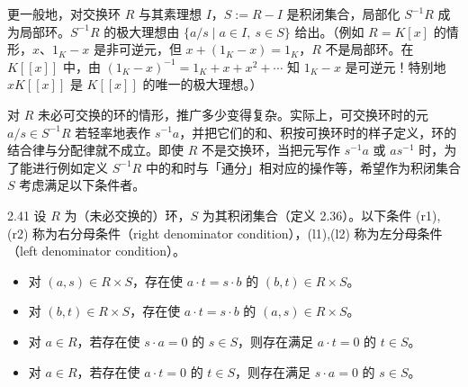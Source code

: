 更一般地，对交换环 $R$ 与其素理想 $I$，$S:=R-I$ 是积闭集合，局部化 $S^{-1}R$ 成为局部环。$S^{-1}R$ 的极大理想由 $\{a/s \mid a\in I,\ s\in S\}$ 给出。（例如 $R=K[x]$ 的情形，$x$、$1_K-x$ 是非可逆元，但 $x+(1_K-x)=1_K$，$R$ 不是局部环。在 $K[[x]]$ 中，由 $(1_K-x)^{-1}=1_K+x+x^2+\cdots$ 知 $1_K-x$ 是可逆元！特别地 $xK[[x]]$ 是 $K[[x]]$ 的唯一的极大理想。）


对 $R$ 未必可交换的环的情形，推广多少变得复杂。实际上，可交换环时的元 $a/s\in S^{-1}R$ 若轻率地表作 $s^{-1}a$，并把它们的和、积按可换环时的样子定义，环的结合律与分配律就不成立。即使 $R$ 不是交换环，当把元写作 $s^{-1}a$ 或 $as^{-1}$ 时，为了能进行例如定义 $S^{-1}R$ 中的和时与「通分」相对应的操作等，希望作为积闭集合 $S$ 考虑满足以下条件者。

\begin{definition}{2.41} 设 $R$ 为（未必交换的）环，$S$ 为其积闭集合（定义 2.36）。以下条件 (r1),(r2) 称为右分母条件（right denominator condition），(l1),(l2) 称为左分母条件（left denominator condition）。
\begin{itemize}
  \item[(r1)] 对 $(a,s)\in R\times S$，存在使 $a\cdot t=s\cdot b$ 的 $(b,t)\in R\times S$。
  \item[(l1)] 对 $(b,t)\in R\times S$，存在使 $a\cdot t=s\cdot b$ 的 $(a,s)\in R\times S$。
  \item[(r2)] 对 $a\in R$，若存在使 $s\cdot a=0$ 的 $s\in S$，则存在满足 $a\cdot t=0$ 的 $t\in S$。
  \item[(l2)] 对 $a\in R$，若存在使 $a\cdot t=0$ 的 $t\in S$，则存在满足 $s\cdot a=0$ 的 $s\in S$。
\end{itemize}
\end{definition}


